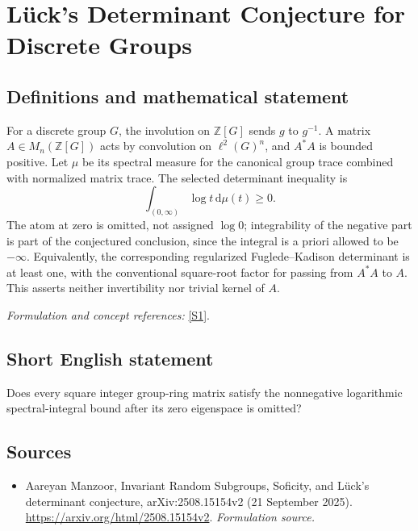 \documentclass[11pt]{article}
\begin{document}
\section*{\texorpdfstring{Lück's Determinant Conjecture for Discrete Groups}{Lück's Determinant Conjecture for Discrete Groups}}\label{425}
\subsection{Definitions and mathematical statement}
For a discrete group $G$, the involution on ${\mathbb{Z}}[G]$ sends $g$ to $g^{-1}$. A matrix $A\in M_n({\mathbb{Z}}[G])$ acts by convolution on $\ell^2(G)^n$, and $A^*A$ is bounded positive. Let $\mu$ be its spectral measure for the canonical group trace combined with normalized matrix trace. The selected determinant inequality is
\[
 \int_{(0,\infty)}\log t{\,\mathrm{d}}\mu(t)\ge0.
\]
The atom at zero is omitted, not assigned $\log0$; integrability of the negative part is part of the conjectured conclusion, since the integral is a priori allowed to be $-\infty$. Equivalently, the corresponding regularized Fuglede--Kadison determinant is at least one, with the conventional square-root factor for passing from $A^*A$ to $A$. This asserts neither invertibility nor trivial kernel of $A$.
\par\smallskip\textit{Formulation and concept references:} \href{https://arxiv.org/html/2508.15154v2}{[S1]}.

\subsection{Short English statement}
Does every square integer group-ring matrix satisfy the nonnegative logarithmic spectral-integral bound after its zero eigenspace is omitted?
\subsection{Sources}
\begin{itemize}
\item[S1]Aareyan Manzoor, Invariant Random Subgroups, Soficity, and Lück's determinant conjecture, arXiv:2508.15154v2 (21 September 2025).
\url{https://arxiv.org/html/2508.15154v2}.
\textit{Formulation source.}
\end{itemize}
\end{document}
